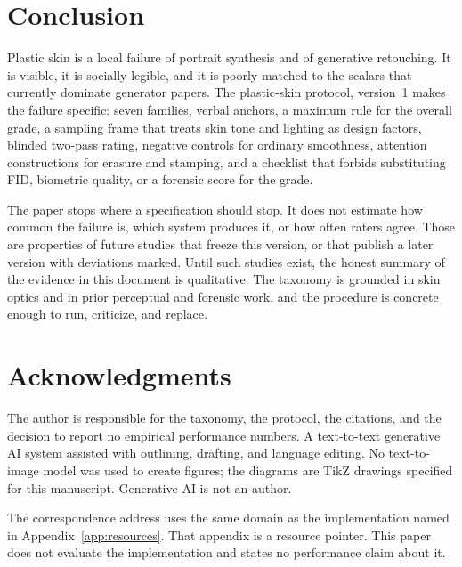 \documentclass[10pt,twocolumn]{article}
\newcommand{\prot}{plastic-skin protocol, version~1}
\begin{document}
\section{Conclusion}
Plastic skin is a local failure of portrait synthesis and of generative retouching. It is visible, it is socially legible, and it is poorly matched to the scalars that currently dominate generator papers. The \prot{} makes the failure specific: seven families, verbal anchors, a maximum rule for the overall grade, a sampling frame that treats skin tone and lighting as design factors, blinded two-pass rating, negative controls for ordinary smoothness, attention constructions for erasure and stamping, and a checklist that forbids substituting FID, biometric quality, or a forensic score for the grade.

The paper stops where a specification should stop. It does not estimate how common the failure is, which system produces it, or how often raters agree. Those are properties of future studies that freeze this version, or that publish a later version with deviations marked. Until such studies exist, the honest summary of the evidence in this document is qualitative. The taxonomy is grounded in skin optics and in prior perceptual and forensic work, and the procedure is concrete enough to run, criticize, and replace.

\section*{Acknowledgments}
The author is responsible for the taxonomy, the protocol, the citations, and the decision to report no empirical performance numbers. A text-to-text generative AI system assisted with outlining, drafting, and language editing. No text-to-image model was used to create figures; the diagrams are TikZ drawings specified for this manuscript. Generative AI is not an author.

The correspondence address uses the same domain as the implementation named in Appendix~\ref{app:resources}. That appendix is a resource pointer. This paper does not evaluate the implementation and states no performance claim about it.
\end{document}
